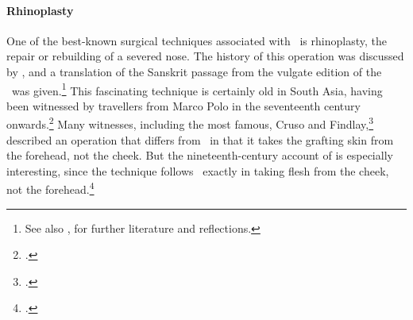 

\paragraph{Rhinoplasty}
\label{sec:rhinoplasty}

One of the best-known surgical techniques associated with \SS\ is rhinoplasty, the
repair or rebuilding of a severed nose. The history of this operation was
discussed by \citet[67--70, 99--100]{wuja-2003}, and a translation of the Sanskrit
passage from the vulgate edition of the \SS\ was given.\footnote{See also
\cite[IB, 327--328, note 186]{meul-hist}, for further literature and reflections.} 
This fascinating technique is certainly old in South Asia, having been witnessed
by travellers from Marco Polo in the seventeenth century
onwards.\footcite[ii.301]{manu-stor} Many witnesses, including the most famous,
Cruso and Findlay,\footcite[883, 891\,f.]{cowasjee} described an operation that
differs from \SS\ in that it takes the grafting skin from the forehead, not the
cheek.  But the nineteenth-century account of \citeauthor{thor-bann} is especially
interesting, since the technique follows \SS\ exactly in taking flesh from the
cheek, not the forehead.\footcite[352--3]{thor-bann}

